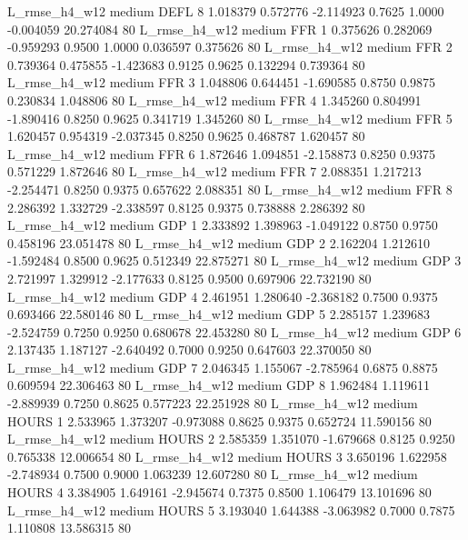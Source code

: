  L_rmse_h4_w12     medium     DEFL                 8  1.018379 0.572776 -2.114923 0.7625 1.0000 -0.004059   20.274084 80
 L_rmse_h4_w12     medium      FFR                 1  0.375626 0.282069 -0.959293 0.9500 1.0000  0.036597    0.375626 80
 L_rmse_h4_w12     medium      FFR                 2  0.739364 0.475855 -1.423683 0.9125 0.9625  0.132294    0.739364 80
 L_rmse_h4_w12     medium      FFR                 3  1.048806 0.644451 -1.690585 0.8750 0.9875  0.230834    1.048806 80
 L_rmse_h4_w12     medium      FFR                 4  1.345260 0.804991 -1.890416 0.8250 0.9625  0.341719    1.345260 80
 L_rmse_h4_w12     medium      FFR                 5  1.620457 0.954319 -2.037345 0.8250 0.9625  0.468787    1.620457 80
 L_rmse_h4_w12     medium      FFR                 6  1.872646 1.094851 -2.158873 0.8250 0.9375  0.571229    1.872646 80
 L_rmse_h4_w12     medium      FFR                 7  2.088351 1.217213 -2.254471 0.8250 0.9375  0.657622    2.088351 80
 L_rmse_h4_w12     medium      FFR                 8  2.286392 1.332729 -2.338597 0.8125 0.9375  0.738888    2.286392 80
 L_rmse_h4_w12     medium      GDP                 1  2.333892 1.398963 -1.049122 0.8750 0.9750  0.458196   23.051478 80
 L_rmse_h4_w12     medium      GDP                 2  2.162204 1.212610 -1.592484 0.8500 0.9625  0.512349   22.875271 80
 L_rmse_h4_w12     medium      GDP                 3  2.721997 1.329912 -2.177633 0.8125 0.9500  0.697906   22.732190 80
 L_rmse_h4_w12     medium      GDP                 4  2.461951 1.280640 -2.368182 0.7500 0.9375  0.693466   22.580146 80
 L_rmse_h4_w12     medium      GDP                 5  2.285157 1.239683 -2.524759 0.7250 0.9250  0.680678   22.453280 80
 L_rmse_h4_w12     medium      GDP                 6  2.137435 1.187127 -2.640492 0.7000 0.9250  0.647603   22.370050 80
 L_rmse_h4_w12     medium      GDP                 7  2.046345 1.155067 -2.785964 0.6875 0.8875  0.609594   22.306463 80
 L_rmse_h4_w12     medium      GDP                 8  1.962484 1.119611 -2.889939 0.7250 0.8625  0.577223   22.251928 80
 L_rmse_h4_w12     medium    HOURS                 1  2.533965 1.373207 -0.973088 0.8625 0.9375  0.652724   11.590156 80
 L_rmse_h4_w12     medium    HOURS                 2  2.585359 1.351070 -1.679668 0.8125 0.9250  0.765338   12.006654 80
 L_rmse_h4_w12     medium    HOURS                 3  3.650196 1.622958 -2.748934 0.7500 0.9000  1.063239   12.607280 80
 L_rmse_h4_w12     medium    HOURS                 4  3.384905 1.649161 -2.945674 0.7375 0.8500  1.106479   13.101696 80
 L_rmse_h4_w12     medium    HOURS                 5  3.193040 1.644388 -3.063982 0.7000 0.7875  1.110808   13.586315 80
